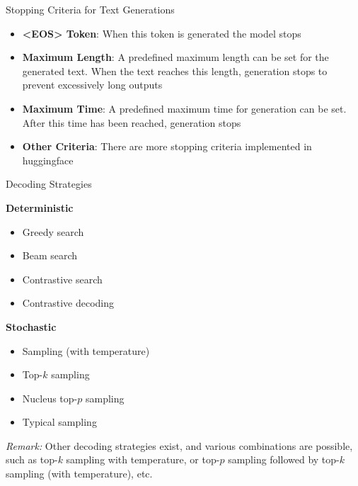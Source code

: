 
\begin{frame}{Stopping Criteria for Text Generations}

\vfill

\begin{itemize}
    \item \textbf{<EOS> Token}: When this token is generated the model stops
    \item \textbf{Maximum Length}: A predefined maximum length can be set for the generated text. When the text reaches this length, generation stops to prevent excessively long outputs
    \item \textbf{Maximum Time}: A predefined maximum time for generation can be set. After this time has been reached, generation stops
    \item \textbf{Other Criteria}: There are more stopping criteria implemented in huggingface 
\end{itemize}

\vfill

\end{frame}


\begin{frame}{Decoding Strategies}

\textbf{Deterministic}
\begin{itemize}
    \item Greedy search
    \item Beam search
    \item Contrastive search 
    \item Contrastive decoding 
\end{itemize}

\textbf{Stochastic}
\begin{itemize}
    \item Sampling (with temperature) 
    \item Top-$k$ sampling 
    \item Nucleus top-$p$ sampling 
    \item Typical sampling 
\end{itemize}
\vspace{1ex}

\textit{Remark:} Other decoding strategies exist, and various combinations are possible, such as top-$k$ sampling with temperature, or top-$p$ sampling followed by top-$k$ sampling (with temperature), etc.

\end{frame}

